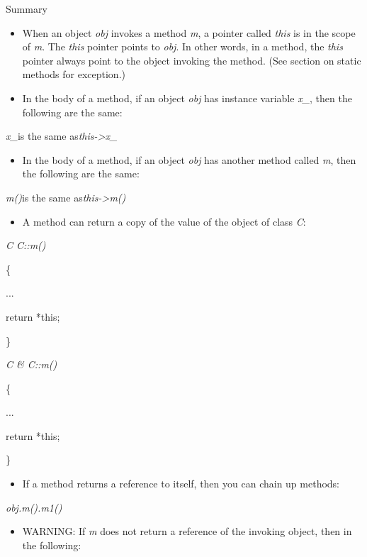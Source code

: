 \documentclass[
]{article}
\providecommand{\tightlist}{%
  \setlength{\itemsep}{0pt}\setlength{\parskip}{0pt}}
\begin{document}
Summary

\begin{itemize}
\tightlist
\item
  When an object \emph{obj} invokes a method \emph{m}, a pointer called
  \emph{this} is in the scope of \emph{m}. The \emph{this} pointer
  points to \emph{obj}. In other words, in a method, the \emph{this}
  pointer always point to the object invoking the method. (See section
  on static methods for exception.)
\end{itemize}

\begin{itemize}
\tightlist
\item
  In the body of a method, if an object \emph{obj} has instance variable
  \emph{x\_}, then the following are the same:
\end{itemize}

\emph{x\_}is the same as\emph{this-\textgreater x\_}

\begin{itemize}
\tightlist
\item
  In the body of a method, if an object \emph{obj} has another method
  called \emph{m}, then the following are the same:
\end{itemize}

\emph{m()}is the same as\emph{this-\textgreater m()}

\begin{itemize}
\tightlist
\item
  A method can return a copy of the value of the object of class
  \emph{C}:
\end{itemize}

\emph{C C::m() }

\{

...

return *this;

\}

\emph{C \& C::m() }

\{

...

return *this;

\}

\begin{itemize}
\tightlist
\item
  If a method returns a reference to itself, then you can chain up
  methods:
\end{itemize}

\emph{obj.m().m1()}

\begin{itemize}
\tightlist
\item
  WARNING: If \emph{m} does not return a reference of the invoking
  object, then in the following:
\end{itemize}
\end{document}
